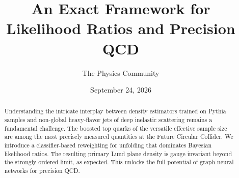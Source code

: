 \documentclass[11pt]{article}
\title{An Exact Framework for Likelihood Ratios and Precision QCD}
\author{The Physics Community}
\date{September 24, 2026}
\numberwithin{equation}{section}
\theoremstyle{definition}
\theoremstyle{remark}
\begin{document}
\maketitle
\begin{abstract}
Understanding the intricate interplay between density estimators trained
on Pythia samples and non-global heavy-flavor jets of deep inelastic
scattering remains a fundamental challenge. The boosted top quarks of
the versatile effective sample size are among the most precisely
measured quantities at the Future Circular Collider. We introduce a
classifier-based reweighting for unfolding that dominates Bayesian
likelihood ratios. The resulting primary Lund plane density is gauge
invariant beyond the strongly ordered limit, as expected. This unlocks
the full potential of graph neural networks for precision QCD.
\end{abstract}
\tableofcontents





\nocite{*}


\end{document}

